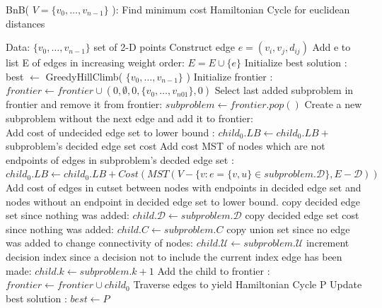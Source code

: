 \documentclass[format=sigconf]{acmart}
\begin{document}
\begin{algorithm}[H] 
	\caption{  BnB( $V = \{v_0, \hdots, v_{n-1}\}$ ): Find minimum cost Hamiltonian Cycle for euclidean distances}
	\begin{algorithmic} 
		\STATE Data: $\{v_0, \hdots, v_{n-1}\}$ set of 2-D points
			\STATE Construct edge $e = (v_i, v_j, d_{ij})$
			\STATE Add e to list E of edges in increasing weight order: $E = E \cup \{e\}$
		\ENDFOR
		\STATE Initialize best solution : best $\leftarrow$ GreedyHillClimb( $\{v_0, \hdots, v_{n-1}\}$ )
		\STATE Initialize frontier : $frontier  \leftarrow frontier \cup (0, \emptyset, 0, \{ v_0, \hdots, v_{n01} \}, 0)$
			\STATE Select last added subproblem in frontier and remove it from frontier: $subproblem \leftarrow frontier.pop()$ \vspace{4pt}
			\STATE Create a new subproblem without the next edge and add it to frontier:\\
			\STATE Add cost of undecided edge set to lower bound : $child_0.LB \leftarrow child_0.LB + $ subproblem's decided edge set cost
			\STATE Add cost MST of nodes which are not endpoints of edges in subproblem's decded edge set : \\
			 $child_0.LB \leftarrow child_0.LB + Cost( MST( V - \{ v : e = \{ v,u \} \in subproblem.\mathcal{D} \}, E-\mathcal{D} ) )$ 
			\STATE Add cost of edges in cutset between nodes with endpoints in decided edge set and nodes without an endpoint in decided edge set to lower bound.
			\STATE copy decided edge set since nothing was added: $child.\mathcal{D} \leftarrow subproblem.\mathcal{D}$
			\STATE copy decided edge set cost since nothing was added: $child.C \leftarrow subproblem.C$ 
			\STATE copy union set since no edge was added to change connectivity of nodes: $child.\mathcal{U} \leftarrow subproblem.\mathcal{U}$ 
			\STATE increment decision index since a decision not to include the current index edge has been made: $child.k \leftarrow subproblem.k+1$
			\STATE Add the child to frontier : $frontier \leftarrow frontier \cup child_0$
			\vspace{4pt}
						\STATE Traverse edges to yield Hamiltonian Cycle P
							\STATE Update best solution : $best \leftarrow P$

\end{algorithmic}
\end{algorithm}
\end{document}
